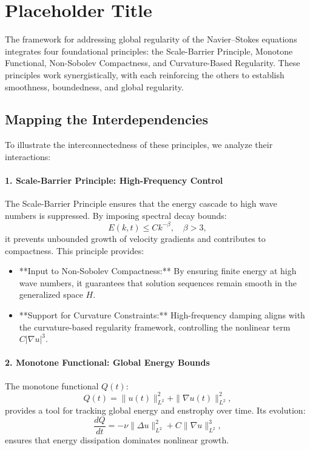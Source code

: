 \section{Placeholder Title}

The framework for addressing global regularity of the Navier--Stokes equations integrates four foundational principles: the Scale-Barrier Principle, Monotone Functional, Non-Sobolev Compactness, and Curvature-Based Regularity. These principles work synergistically, with each reinforcing the others to establish smoothness, boundedness, and global regularity.

\subsection{Mapping the Interdependencies}
To illustrate the interconnectedness of these principles, we analyze their interactions:

\paragraph{1. Scale-Barrier Principle: High-Frequency Control}
The Scale-Barrier Principle ensures that the energy cascade to high wave numbers is suppressed. By imposing spectral decay bounds:
\begin{equation}
E(k, t) \leq C k^{-\beta}, \quad \beta > 3,
\label{eq:scale_barrier_energy_decay}
\end{equation}
it prevents unbounded growth of velocity gradients and contributes to compactness. This principle provides:
\begin{itemize}
    \item **Input to Non-Sobolev Compactness:** By ensuring finite energy at high wave numbers, it guarantees that solution sequences remain smooth in the generalized space $H$.
    \item **Support for Curvature Constraints:** High-frequency damping aligns with the curvature-based regularity framework, controlling the nonlinear term $C |\nabla u|^3$.
\end{itemize}

\paragraph{2. Monotone Functional: Global Energy Bounds}
The monotone functional $Q(t)$:
\begin{equation}
Q(t) = \|u(t)\|_{L^2}^2 + \|\nabla u(t)\|_{L^2}^2,
\label{eq:monotone_functional}
\end{equation}
provides a tool for tracking global energy and enstrophy over time. Its evolution:
\begin{equation}
\frac{dQ}{dt} = -\nu \|\Delta u\|_{L^2}^2 + C \|\nabla u\|_{L^2}^3,
\end{equation}
ensures that energy dissipation dominates nonlinear growth.

